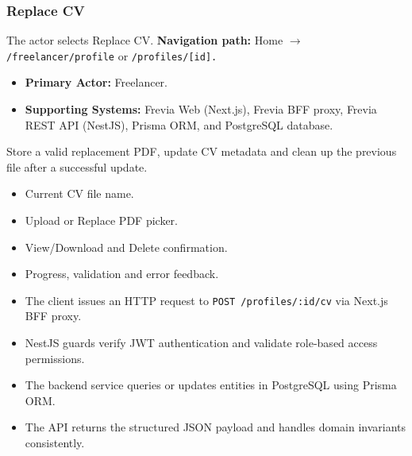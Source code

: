 \subsubsection{Replace CV}

The actor selects Replace CV.\newline
\textbf{Navigation path:} Home $\rightarrow$ \texttt{/\allowbreak{}freelancer/\allowbreak{}profile} or \texttt{/\allowbreak{}profiles/\allowbreak{}[id].}


\begin{itemize}[leftmargin=1.6em,topsep=3pt,itemsep=2pt,parsep=0pt,label=$\bullet$]
    \item \textbf{Primary Actor:} Freelancer.
    \item \textbf{Supporting Systems:} Frevia Web (Next.js), Frevia BFF proxy, Frevia REST API (NestJS), Prisma ORM, and PostgreSQL database.
\end{itemize}

\noindent Store a valid replacement PDF, update CV metadata and clean up the previous file after a successful update.

\begin{itemize}[leftmargin=1.6em,topsep=3pt,itemsep=2pt,parsep=0pt,label=$\bullet$]
    \item Current CV file name.
    \item Upload or Replace PDF picker.
    \item View/Download and Delete confirmation.
    \item Progress, validation and error feedback.
\end{itemize}

\begin{itemize}[leftmargin=1.6em,topsep=3pt,itemsep=2pt,parsep=0pt,label=$\bullet$]
    \item The client issues an HTTP request to \texttt{POST /\allowbreak{}profiles/\allowbreak{}:\allowbreak{}id/\allowbreak{}cv} via Next.js BFF proxy.
    \item NestJS guards verify JWT authentication and validate role-based access permissions.
    \item The backend service queries or updates entities in PostgreSQL using Prisma ORM.
    \item The API returns the structured JSON payload and handles domain invariants consistently.
\end{itemize}

